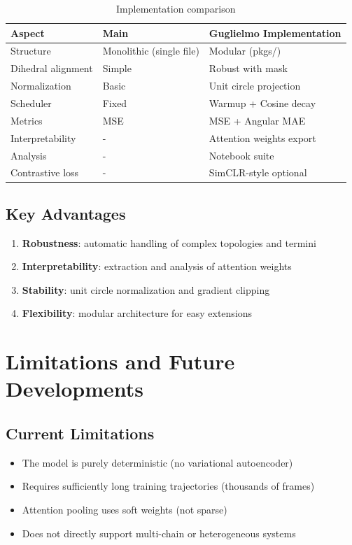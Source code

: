 \documentclass[12pt,a4paper]{article}
\begin{document}
\begin{table}[h]
\centering
\small
\begin{tabular}{@{}lll@{}}
\toprule
\textbf{Aspect} & \textbf{Main} & \textbf{Guglielmo Implementation} \\
\midrule
Structure & Monolithic (single file) & Modular (pkgs/) \\
Dihedral alignment & Simple & Robust with mask \\
Normalization & Basic & Unit circle projection \\
Scheduler & Fixed & Warmup + Cosine decay \\
Metrics & MSE & MSE + Angular MAE \\
Interpretability & - & Attention weights export \\
Analysis & - & Notebook suite \\
Contrastive loss & - & SimCLR-style optional \\
\bottomrule
\end{tabular}
\caption{Implementation comparison}
\end{table}

\subsection{Key Advantages}

\begin{enumerate}
    \item \textbf{Robustness}: automatic handling of complex topologies and termini
    \item \textbf{Interpretability}: extraction and analysis of attention weights
    \item \textbf{Stability}: unit circle normalization and gradient clipping
    \item \textbf{Flexibility}: modular architecture for easy extensions
\end{enumerate}

\section{Limitations and Future Developments}

\subsection{Current Limitations}
\begin{itemize}
    \item The model is purely deterministic (no variational autoencoder)
    \item Requires sufficiently long training trajectories (thousands of frames)
    \item Attention pooling uses soft weights (not sparse)
    \item Does not directly support multi-chain or heterogeneous systems
\end{itemize}
\end{document}
